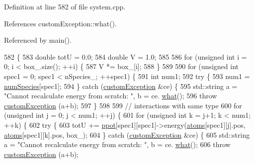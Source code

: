 Definition at line 582 of file system.\+cpp.



References custom\+Exception\+::what().



Referenced by main().


\begin{DoxyCode}
582                                        \{
583     \textcolor{keywordtype}{double} totU = 0.0;
584     \textcolor{keywordtype}{double} V = 1.0;
585     
586     \textcolor{keywordflow}{for} (\textcolor{keywordtype}{unsigned} \textcolor{keywordtype}{int} i = 0; i < box\_.size(); ++i) \{
587                 V *= box\_[i];
588     \}
589     
590     \textcolor{keywordflow}{for} (\textcolor{keywordtype}{unsigned} \textcolor{keywordtype}{int} spec1 = 0; spec1 < nSpecies\_; ++spec1) \{
591         \textcolor{keywordtype}{int} num1;
592         \textcolor{keywordflow}{try} \{
593             num1 = \hyperlink{classsim_system_a9eea865e6dc1cff377b1e79c4d9c23f0}{numSpecies}[spec1];
594         \} \textcolor{keywordflow}{catch} (\hyperlink{classcustom_exception}{customException} &ce) \{
595             std::string a = \textcolor{stringliteral}{"Cannot recalculate energy from scratch: "}, b = ce.
      \hyperlink{classcustom_exception_aeb6ab5848b038adfc68fde86a512f691}{what}();
596             \textcolor{keywordflow}{throw} \hyperlink{classcustom_exception}{customException} (a+b);
597         \}
598                                 
599         \textcolor{comment}{// interactions with same type}
600         \textcolor{keywordflow}{for} (\textcolor{keywordtype}{unsigned} \textcolor{keywordtype}{int} j = 0; j < num1; ++j) \{
601             \textcolor{keywordflow}{for} (\textcolor{keywordtype}{unsigned} \textcolor{keywordtype}{int} k = j+1; k < num1; ++k) \{
602                 \textcolor{keywordflow}{try} \{
603                     totU += \hyperlink{classsim_system_a8d6271751a62f61edcf57f773540a4a3}{ppot}[spec1][spec1]->energy(\hyperlink{classsim_system_a90421b19082f7fb8fc23b7264b1161e4}{atoms}[spec1][j].pos, 
      \hyperlink{classsim_system_a90421b19082f7fb8fc23b7264b1161e4}{atoms}[spec1][k].pos, box\_);                
604                 \} \textcolor{keywordflow}{catch} (\hyperlink{classcustom_exception}{customException} &ce) \{
605                     std::string a = \textcolor{stringliteral}{"Cannot recalculate energy from scratch: "}, b = ce.
      \hyperlink{classcustom_exception_aeb6ab5848b038adfc68fde86a512f691}{what}();
606                     \textcolor{keywordflow}{throw} \hyperlink{classcustom_exception}{customException} (a+b);

\end{DoxyCode}
